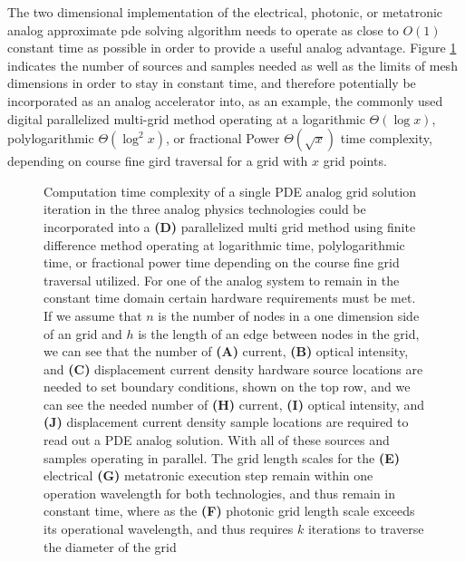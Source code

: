 \par The two dimensional implementation of the electrical, photonic, or metatronic analog approximate \acrshort{pde} solving algorithm needs to operate as close to $O(1)$ constant time as possible in order to provide a useful analog advantage. Figure \ref{fig:2_01_computational_time_complexity} indicates the number of sources and samples needed as well as the limits of mesh dimensions in order to stay in constant time, and therefore potentially be incorporated as an analog accelerator into, as an example, the commonly used digital parallelized multi-grid method operating at a logarithmic $\Theta(\log x)$, polylogarithmic $\Theta(\log^2 x)$, or fractional Power $\Theta(\sqrt{x})$ time complexity, depending on course fine gird traversal for a grid with $x$ grid points. 

\begin{figure}[ht]
\centering{}
\caption{Computation time complexity of a single PDE analog grid solution iteration in the three analog physics technologies could be incorporated into a \textbf{(D)} parallelized  multi grid method using finite difference method operating at logarithmic time, polylogarithmic time, or fractional power time depending on the course fine grid traversal utilized. For one of the analog system to remain in the constant time domain certain hardware requirements must be met. If we assume that $n$ is the number of nodes in a one dimension side of an grid and $h$ is the length of an edge between nodes in the grid, we can see that the number of \textbf{(A)} current, \textbf{(B)} optical intensity, and \textbf{(C)} displacement current density hardware source locations are needed to set boundary conditions, shown on the top row, and we can see the needed number of \textbf{(H)} current, \textbf{(I)} optical intensity, and \textbf{(J)} displacement current density sample locations are  required to read out a PDE analog solution. With all of these sources and samples operating in parallel. The grid length scales for the \textbf{(E)} electrical \textbf{(G)} metatronic execution step remain within one operation wavelength for both technologies, and thus remain in constant time, where as the \textbf{(F)} photonic grid length scale exceeds its operational wavelength, and thus requires $k$ iterations to traverse the diameter of the grid}
\label{fig:2_01_computational_time_complexity}
\end{figure}







